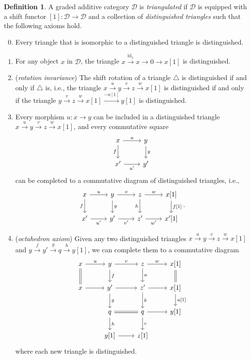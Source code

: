 \documentclass[10pt,letterpaper,cm]{nupset}
\theoremstyle{definition}
\newtheorem*{definition}{Definition}
\newcommand{\1}{\mathbf{1}}
\renewcommand{\d}{\mathscr{D}}
\newcommand{\0}{\vec 0}
\DeclareMathOperator{\id}{id}
\begin{document}
\begin{definition}
A graded additive category $\d$ is \textit{triangulated} if $\d$ is equipped with a shift functor $[1] : \d \to \d$ and a collection of \textit{distinguished triangles} such that the following axioms hold.
\begin{enumerate}
\setcounter{enumi}{-1}
\item Every triangle that is isomorphic to a distinguished triangle is distinguished. 
\item For any object $x$ in $\d$, the triangle $x \overset{\id_x}{\longrightarrow} x \to 0 \to x[1]$ is distinguished.
\item (\textit{rotation invariance}) The shift rotation of a triangle $\triangle$ is distinguished if and only if $\triangle$ is, i.e., the triangle $x\overset{u}{\longrightarrow} y\overset{v}{\longrightarrow}z \overset{w}{\longrightarrow}  x[1]$ is distinguished if and only if the triangle $ y\overset{v}{\longrightarrow}z \overset{w}{\longrightarrow}  x[1] \overset{{-}u[1]}{\longrightarrow} y[1]$  is distinguished. 
\item Every morphism $u : x \to y$ can be included in a distinguished triangle $x\overset{u}{\longrightarrow} y\overset{v}{\longrightarrow}z \overset{w}{\longrightarrow}  x[1]$, and every commutative square 
\[
\begin{tikzcd}
x \arrow[r, "u"] \arrow[d, "f"'] & y \arrow[d, "g"] \\
x' \arrow[r, "u'"']              & y'              
\end{tikzcd}
\]
can be completed to a commutative diagram of distinguished triangles, i.e., 
\[
\begin{tikzcd}
x \arrow[r, "u"] \arrow[d, "f"'] & y \arrow[r, "v"] \arrow[d, "g"] & z \arrow[r, "w"] \arrow[d, "h"'] & {x[1]} \arrow[d, "{f[1]}"] \\
x' \arrow[r, "u'"']              & y' \arrow[r, "v'"']             & z' \arrow[r, "w'"']              & {x'[1]}                   
\end{tikzcd}
.\]
\item (\textit{octahedron axiom}) Given any two distinguished triangles $x\overset{u}{\longrightarrow} y\overset{v}{\longrightarrow}z \overset{w}{\longrightarrow} x[1]$ and $y\overset{f}{\longrightarrow} y'\overset{g}{\longrightarrow}q \overset{h}{\longrightarrow}  y[1]$, we can complete them to a commutative diagram
\[
\begin{tikzcd}
x \arrow[d, equals] \arrow[r, "u"] & y \arrow[d, "f"] \arrow[r, "v"] & z \arrow[d, "a"] \arrow[r, "w"] & {x[1]} \arrow[d, equals]           \\
x \arrow[r]                & y' \arrow[d, "g"] \arrow[r]     & z' \arrow[d, "b"] \arrow[r]     & {x[1]} \arrow[d, "{u[1]}"] \\
                           & q \arrow[r, equals] \arrow[d, "h"]      & q \arrow[r] \arrow[d, "c"]      & {y[1]} \\
                           & {y[1]} \arrow[r]                & {z[1]}               &                     
\end{tikzcd}
\]
where each new triangle is distinguished. 
\end{enumerate}
\end{definition}
\end{document}
